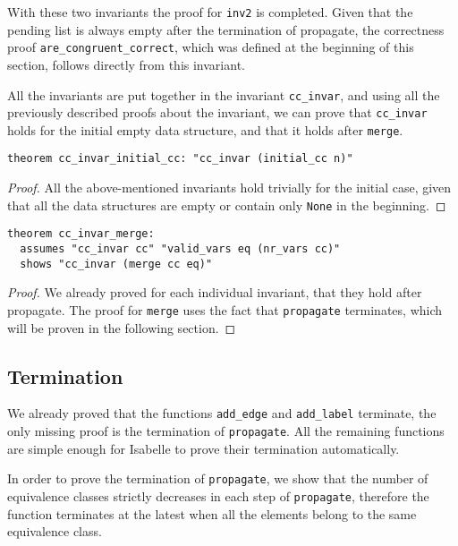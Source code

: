 With these two invariants the proof for \lstinline{inv2} is completed. Given that the pending list is always empty after the termination of propagate, the correctness proof \lstinline{are_congruent_correct}, which was defined at the beginning of this section, follows directly from this invariant.

All the invariants are put together in the invariant \lstinline{cc_invar}, and using all the previously described proofs about the invariant, we can prove that \lstinline{cc_invar} holds for the initial empty data structure, and that it holds after \lstinline{merge}.

\begin{lstlisting}
theorem cc_invar_initial_cc: "cc_invar (initial_cc n)"
\end{lstlisting}

\begin{proof}
All the above-mentioned invariants hold trivially for the initial case, given that all the data structures are empty or contain only \lstinline{None} in the beginning.
\end{proof}

\begin{lstlisting}
theorem cc_invar_merge:
  assumes "cc_invar cc" "valid_vars eq (nr_vars cc)"
  shows "cc_invar (merge cc eq)"
\end{lstlisting}

\begin{proof}
We already proved for each individual invariant, that they hold after propagate.
The proof for \lstinline|merge| uses the fact that \lstinline{propagate} terminates, which will be proven in the following section.
\end{proof}

\subsection{Termination}

We already proved that the functions \lstinline|add_edge| and \lstinline|add_label| terminate, the only missing proof is the termination of \lstinline|propagate|. All the remaining functions are simple enough for Isabelle to prove their termination automatically.

In order to prove the termination of \lstinline{propagate}, we show that the number of equivalence classes strictly decreases in each step of \lstinline{propagate}, therefore the function terminates at the latest when all the elements belong to the same equivalence class.

